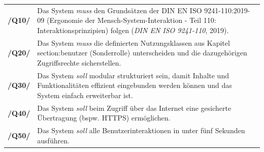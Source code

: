 \begin{center}
    \renewcommand{\arraystretch}{1.5}
    \begin{tabular}{p{}p{}}
    \hline
            \textbf{/Q10/} & Das System \textit{muss} den Grundsätzen der DIN EN ISO
            9241-110:2019-09 (Ergonomie der Mensch-System-Interaktion - Teil 110:
            Interaktionsprinzipien) folgen (\textit{DIN EN ISO 9241-110}, 2019).\\
            \textbf{/Q20/} & Das System \textit{muss} die definierten Nutzungsklassen aus Kapitel
            section:benutzer (Sonderrolle) unterscheiden und die dazugehörigen Zugriffsrechte
            sicherstellen.\\
            \textbf{/Q30/} & Das System \textit{soll} modular strukturiert sein, damit Inhalte und Funktionalitäten effizient eingebunden werden können und das System einfach erweiterbar ist.\\
            \textbf{/Q40/} & Das System \textit{soll} beim Zugriff über das Internet eine gesicherte Übertragung (bspw. HTTPS) ermöglichen.\\
            \textbf{/Q50/} & Das System \textit{soll} alle Benutzerinteraktionen in unter fünf Sekunden ausführen.\\
    \hline
    \end{tabular}
\end{center}
